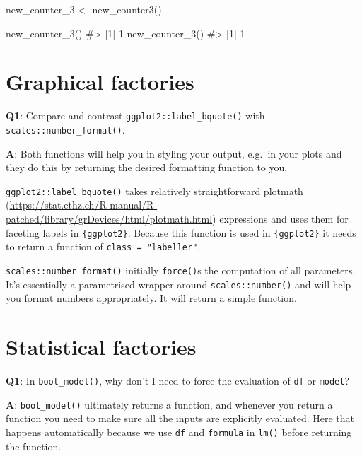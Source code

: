 \documentclass[
]{krantz}
\makeatletter
\newenvironment{Shaded}{\begin{snugshade}}{\end{snugshade}}
\newcommand{\CommentTok}[1]{\textcolor[rgb]{0.56,0.35,0.01}{\textit{#1}}}
\newcommand{\DecValTok}[1]{\textcolor[rgb]{0.00,0.00,0.81}{#1}}
\newcommand{\KeywordTok}[1]{\textcolor[rgb]{0.13,0.29,0.53}{\textbf{#1}}}
\newcommand{\NormalTok}[1]{#1}
\newcommand{\StringTok}[1]{\textcolor[rgb]{0.31,0.60,0.02}{#1}}
\renewcommand{\href}[2]{#2 (\url{#1})}
\newenvironment{kframe}{%
\medskip{}
\setlength{\fboxsep}{.8em}
 \def\at@end@of@kframe{}%
 \ifinner\ifhmode%
  \def\at@end@of@kframe{\end{minipage}}%
  \begin{minipage}{\columnwidth}%
 \fi\fi%
 \def\FrameCommand##1{\hskip\@totalleftmargin \hskip-\fboxsep
 \colorbox{shadecolor}{##1}\hskip-\fboxsep
     \hskip-\linewidth \hskip-\@totalleftmargin \hskip\columnwidth}%
 \MakeFramed {\advance\hsize-\width
   \@totalleftmargin\z@ \linewidth\hsize
   \@setminipage}}%
 {\par\unskip\endMakeFramed%
 \at@end@of@kframe}
\renewenvironment{Shaded}{\begin{kframe}}{\end{kframe}}
\renewcommand{\KeywordTok} [1]{\textcolor[rgb]{0.00,0.44,0.13}{{#1}}}
\renewcommand{\DecValTok}  [1]{\textcolor[rgb]{0.25,0.63,0.44}{{#1}}}
\renewcommand{\StringTok}  [1]{\textcolor[rgb]{0.25,0.44,0.63}{{#1}}}
\renewcommand{\CommentTok} [1]{\textcolor[rgb]{0.38,0.63,0.69}{{#1}}}
\renewcommand{\NormalTok}  [1]{{#1}}
\makeatother
\begin{document}
\begin{Shaded}
\begin{Highlighting}[]
\NormalTok{new_counter_}\DecValTok{3}\NormalTok{ <-}\StringTok{ }\KeywordTok{new_counter3}\NormalTok{()}

\KeywordTok{new_counter_3}\NormalTok{()}
\CommentTok{#> [1] 1}
\KeywordTok{new_counter_3}\NormalTok{()}
\CommentTok{#> [1] 1}
\end{Highlighting}
\end{Shaded}

\hypertarget{graphical-factories}{%
\section{Graphical factories}\label{graphical-factories}}

\textbf{{Q1}}: Compare and contrast \texttt{ggplot2::label\_bquote()} with \texttt{scales::number\_format()}.

\textbf{{A}}: Both functions will help you in styling your output, e.g.~in your plots and they do this by returning the desired formatting function to you.

\texttt{ggplot2::label\_bquote()} takes relatively straightforward \href{https://stat.ethz.ch/R-manual/R-patched/library/grDevices/html/plotmath.html}{plotmath} expressions and uses them for faceting labels in \texttt{\{ggplot2\}}. Because this function is used in \texttt{\{ggplot2\}} it needs to return a function of \texttt{class\ =\ "labeller"}.

\texttt{scales::number\_format()} initially \texttt{force()}s the computation of all parameters. It's essentially a parametrised wrapper around \texttt{scales::number()} and will help you format numbers appropriately. It will return a simple function.

\hypertarget{statistical-factories}{%
\section{Statistical factories}\label{statistical-factories}}

\textbf{{Q1}}: In \texttt{boot\_model()}, why don't I need to force the evaluation of \texttt{df} or \texttt{model}?

\textbf{{A}}: \texttt{boot\_model()} ultimately returns a function, and whenever you return a function you need to make sure all the inputs are explicitly evaluated. Here that happens automatically because we use \texttt{df} and \texttt{formula} in \texttt{lm()} before returning the function.
\end{document}
